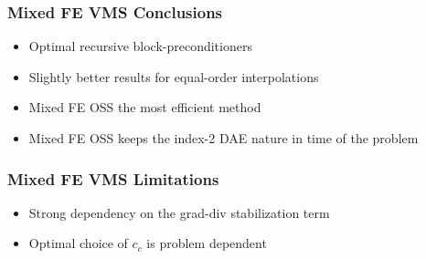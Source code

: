 \begin{frame}
\frametitle{Mixed FE VMS Conclusions}
\vfill
\begin{itemize}
\item<1-> Optimal recursive block-preconditioners
\item<2-> Slightly better results for equal-order interpolations
\item<3-> Mixed FE OSS the most efficient method
\item<4-> Mixed FE OSS keeps the index-2 DAE nature in time of the problem
\end{itemize}
\vfill
\end{frame}
\begin{frame}
\frametitle{Mixed FE VMS Limitations}
\vfill
\begin{itemize}
\item<1-> Strong dependency on the grad-div stabilization term
\item<2-> Optimal choice of $ c_c $ is problem dependent
\end{itemize}
\vfill
\end{frame}